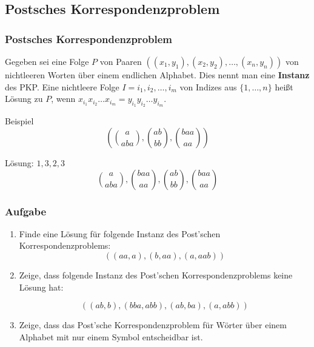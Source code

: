 \subsection{Postsches Korrespondenzproblem}
\begin{frame}
\frametitle{Postsches Korrespondenzproblem}
Gegeben sei eine Folge $P$ von Paaren $((x_1, y_1), (x_2, y_2), \ldots, (x_n,y_n))$ von nichtleeren Worten über einem endlichen Alphabet. Dies nennt man eine \textbf{Instanz} des PKP.
Eine nichtleere Folge $I = i_1, i_2, \ldots, i_m$ von Indizes aus $\{1, \ldots, n\}$ heißt Lösung zu $P$, wenn $x_{i_1}x_{i_2}\ldots{}x_{i_m} = y_{i_1}y_{i_2}\ldots{}y_{i_m}$.
\begin{block}{Beispiel}
\begin{displaymath}
( {a \choose aba}, {ab \choose bb}, {baa \choose aa} )
\end{displaymath}

Lösung: $1,3,2,3$
\begin{displaymath}
{a \choose aba}, {baa \choose aa}, {ab \choose bb}, {baa \choose aa}
\end{displaymath}

\end{block}
\end{frame}

\begin{frame}
\frametitle{Aufgabe}
\begin{enumerate}
\item Finde eine Lösung für folgende Instanz des Post'schen Korrespondenzproblems: 
\[ ((aa, a), (b, aa), (a, aab)) \]
  \item Zeige, dass folgende Instanz des Post'schen Korrespondenzproblems
        keine Lösung hat:

        \[ ((ab, b), (bba, abb), (ab, ba), (a, abb)) \]

  \item Zeige, dass das Post'sche Korrespondenzproblem für Wörter
über einem Alphabet mit nur einem Symbol entscheidbar ist.
\end{enumerate}
\end{frame}


